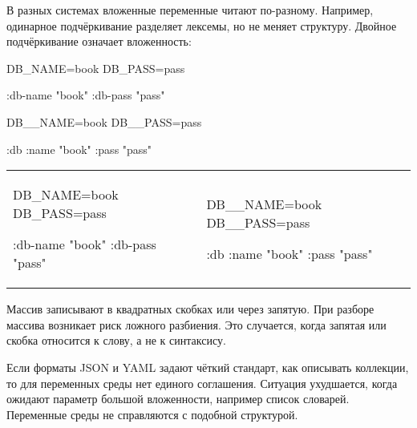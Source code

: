 \fi

В разных системах вложенные переменные читают по-разному. Например, одинарное
подчёркивание разделяет лексемы, но не меняет структуру. Двойное подчёркивание
означает вложенность:

\ifnarrow

\begin{english}
  \begin{clojure}
DB_NAME=book
DB_PASS=pass

{:db-name "book"
 :db-pass "pass"}
  \end{clojure}

\splitter

  \begin{clojure}
DB__NAME=book
DB__PASS=pass

{:db {:name "book"
      :pass "pass"}}
  \end{clojure}
\end{english}

\else

\begin{english}

\noindent
\begin{tabular}{ @{}p{5cm} @{}p{5cm} }

  \begin{clojure}
DB_NAME=book
DB_PASS=pass

{:db-name "book"
 :db-pass "pass"}
  \end{clojure}

&

  \begin{clojure}
DB__NAME=book
DB__PASS=pass

{:db {:name "book"
      :pass "pass"}}
  \end{clojure}

\end{tabular}

\end{english}

\fi


Массив записывают в квадратных скобках или через запятую. При разборе массива
возникает риск ложного разбиения. Это случается, когда запятая или скобка
относится к слову, а не к синтаксису.


Если форматы JSON и YAML задают чёткий стандарт, как описывать коллекции, то для
переменных среды нет единого соглашения. Ситуация ухудшается, когда ожидают
параметр большой вложенности, например список словарей. Переменные среды не
справляются с подобной структурой.

